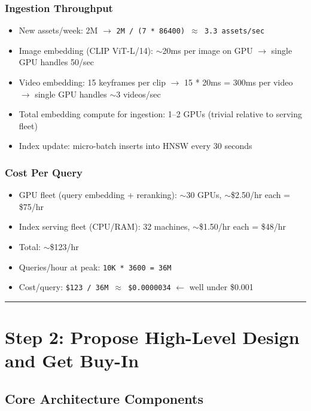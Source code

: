 \subsubsection*{Ingestion Throughput}

\begin{itemize}
  \item New assets/week: 2M $\rightarrow$ \texttt{2M / (7 * 86400) $\approx$ 3.3 assets/sec}
  \item Image embedding (CLIP ViT-L/14): $\sim$20ms per image on GPU $\rightarrow$ single GPU handles 50/sec
  \item Video embedding: 15 keyframes per clip $\rightarrow$ 15 * 20ms = 300ms per video $\rightarrow$ single GPU handles $\sim$3 videos/sec
  \item Total embedding compute for ingestion: 1--2 GPUs (trivial relative to serving fleet)
  \item Index update: micro-batch inserts into HNSW every 30 seconds
\end{itemize}

\subsubsection*{Cost Per Query}

\begin{itemize}
  \item GPU fleet (query embedding + reranking): $\sim$30 GPUs, $\sim$\$2.50/hr each = \$75/hr
  \item Index serving fleet (CPU/RAM): 32 machines, $\sim$\$1.50/hr each = \$48/hr
  \item Total: $\sim$\$123/hr
  \item Queries/hour at peak: \texttt{10K * 3600 = 36M}
  \item Cost/query: \texttt{\$123 / 36M $\approx$ \$0.0000034} $\leftarrow$ well under \$0.001
\end{itemize}

\bigskip\hrule\bigskip

\section*{Step 2: Propose High-Level Design and Get Buy-In}

\subsection*{Core Architecture Components}

